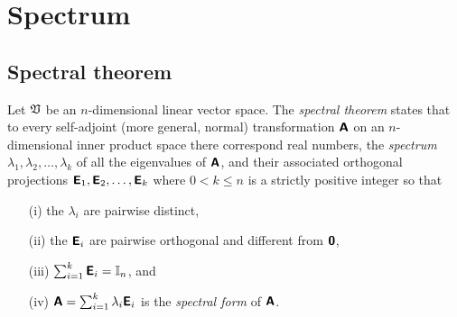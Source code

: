 \section{Spectrum}

\subsection{Spectral theorem}
\label{2012-m-ch-Spectraltheorem}

Let $\frak V$ be an $n$-dimensional linear vector space.
The {\em spectral theorem} states
that to every self-adjoint (more general, normal) transformation $ \textsf{\textbf{A}}$
on an $n$-dimensional inner product space there correspond real numbers, the {\em spectrum}
$
\lambda_1,
\lambda_2, \ldots ,
\lambda_k
$
of all the eigenvalues of   $ \textsf{\textbf{A}}$,
and their associated  orthogonal projections
$
\textsf{\textbf{E}}_1,
\textsf{\textbf{E}}_2, \ldots ,
\textsf{\textbf{E}}_k
$
where $0<k\le n$ is a strictly positive integer so that
\begin{itemize}
\item[(i)]
the $\lambda_i$ are pairwise distinct,
\item[(ii)]
the $\textsf{\textbf{E}}_i$ are pairwise orthogonal and different from $\textsf{\textbf{0}}$,
\item[(iii)]
$\sum_{i=1}^k \textsf{\textbf{E}}_i={\Bbb I}_n$, and
\item[(iv)]
$
\textsf{\textbf{A}}=\sum_{i=1}^k \lambda_i\textsf{\textbf{E}}_i
$
is the {\em spectral form} of $\textsf{\textbf{A}}$.
\end{itemize}


